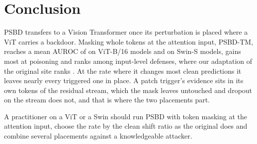 \section{Conclusion}
\label{sec:conclusion}

PSBD transfers to a Vision Transformer once its perturbation is placed where a ViT carries a backdoor. Masking whole tokens at the attention input, PSBD-TM, reaches a mean AUROC of \HeadlineAurocAdaptive{} on \PanelCellsCached{} ViT-B/16 models and \SwinRecommendedAurocAdaptive{} on \SwinCells{} Swin-S models, gains most at \PanelRateLow{} poisoning and ranks \DetectorsAurocRankOurs{} among \DetectorsAurocDefensesRanked{} input-level defenses, where our adaptation of the original site ranks \DetectorsAurocRankPublished{}. At the rate where it changes most clean predictions it leaves nearly every triggered one in place. A patch trigger's evidence sits in its own tokens of the residual stream, which the mask leaves untouched and dropout on the stream does not, and that is where the two placements part.

A practitioner on a ViT or a Swin should run PSBD with token masking at the attention input, choose the rate by the clean shift ratio as the original does and combine several placements against a knowledgeable attacker.
